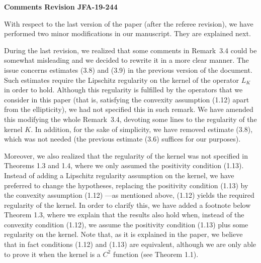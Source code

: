 \documentclass[12pt]{report}
\title{}
\author{}
\begin{document}
	
	\begin{center}
		\textbf{	Comments Revision JFA-19-244}
	\end{center}

With respect to the last version of the paper (after the referee revision), we have performed two minor modifications in our manuscript. They are explained next.

During the last revision, we realized that some comments in Remark~3.4 could be somewhat misleading and we decided to rewrite it in a more clear manner. The issue concerns estimates (3.8) and (3.9) in the previous version of the document. Such estimates require the Lipschitz regularity on the kernel of the operator $L_K$ in order to hold. Although this regularity is fulfilled by the operators that we consider in this paper (that is, satisfying the convexity assumption (1.12) apart from the ellipticity), we had not specified this in such remark. We have amended this modifying the whole Remark~3.4, devoting some lines to the regularity of the kernel $K$. In addition, for the sake of simplicity, we have removed estimate (3.8), which was not needed (the previous estimate (3.6) suffices for our purposes).

Moreover, we also realized that the regularity of the kernel was not specified in Theorems 1.3 and 1.4, where we only assumed the positivity condition (1.13). Instead of adding a Lipschitz regularity assumption on the kernel, we have preferred to change the hypotheses, replacing the positivity condition (1.13) by the convexity assumption (1.12) ---as mentioned above, (1.12) yields the required regularity of the kernel. In order to clarify this, we have added a footnote below  Theorem 1.3, where we explain that the results also hold when, instead of the convexity condition (1.12), we assume the positivity condition (1.13) plus some regularity on the kernel. Note that, as it is explained in the paper, we believe that in fact conditions (1.12) and (1.13) are equivalent, although we are only able to prove it when the kernel is a $C^2$ function (see Theorem 1.1).  
\end{document}
